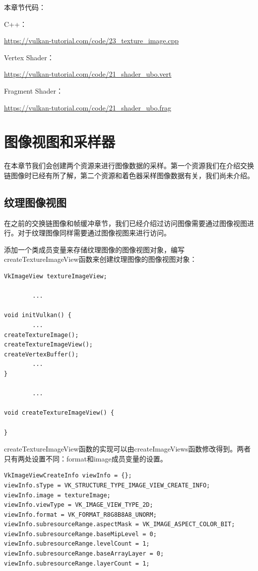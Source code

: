\documentclass{ctexart}
\begin{document}
本章节代码：

C++：

\url{https://vulkan-tutorial.com/code/23_texture_image.cpp}

Vertex Shader：

\url{https://vulkan-tutorial.com/code/21_shader_ubo.vert}

Fragment Shader：

\url{https://vulkan-tutorial.com/code/21_shader_ubo.frag}

\newpage
\section{图像视图和采样器}

在本章节我们会创建两个资源来进行图像数据的采样。第一个资源我们在介绍交换链图像时已经有所了解，第二个资源和着色器采样图像数据有关，我们尚未介绍。

\subsection{纹理图像视图}

在之前的交换链图像和帧缓冲章节，我们已经介绍过访问图像需要通过图像视图进行。对于纹理图像同样需要通过图像视图来进行访问。

添加一个类成员变量来存储纹理图像的图像视图对象，编写createTextureImageView函数来创建纹理图像的图像视图对象：

\begin{lstlisting}[language={[ANSI]C}]
VkImageView textureImageView;

		...

void initVulkan() {
		...
createTextureImage();
createTextureImageView();
createVertexBuffer();
		...
}

		...

void createTextureImageView() {

}
\end{lstlisting}

createTextureImageView函数的实现可以由createImageViews函数修改得到。两者只有两处设置不同：format和image成员变量的设置。

\begin{lstlisting}[language={[ANSI]C}]
VkImageViewCreateInfo viewInfo = {};
viewInfo.sType = VK_STRUCTURE_TYPE_IMAGE_VIEW_CREATE_INFO;
viewInfo.image = textureImage;
viewInfo.viewType = VK_IMAGE_VIEW_TYPE_2D;
viewInfo.format = VK_FORMAT_R8G8B8A8_UNORM;
viewInfo.subresourceRange.aspectMask = VK_IMAGE_ASPECT_COLOR_BIT;
viewInfo.subresourceRange.baseMipLevel = 0;
viewInfo.subresourceRange.levelCount = 1;
viewInfo.subresourceRange.baseArrayLayer = 0;
viewInfo.subresourceRange.layerCount = 1;
\end{lstlisting}
\end{document}
